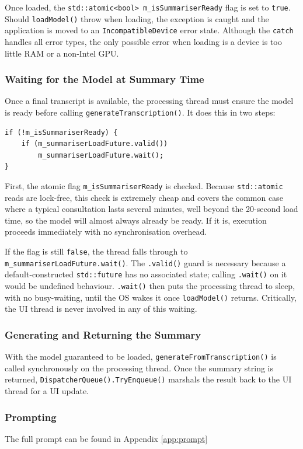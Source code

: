 Once loaded, the \texttt{std::atomic<bool> m\_isSummariserReady} flag is set to \texttt{true}. Should \texttt{loadModel()} throw when loading, the exception is caught and the application is moved to an \texttt{IncompatibleDevice} error state. Although the \texttt{catch} handles all error types, the only possible error when loading is a device is too little RAM or a non-Intel GPU.

\subsubsection{Waiting for the Model at Summary Time}
Once a final transcript is available, the processing thread must ensure the model is ready before calling \texttt{generateTranscription()}. It does this in two steps:

\begin{verbatim}
if (!m_isSummariserReady) {
    if (m_summariserLoadFuture.valid())
        m_summariserLoadFuture.wait();
}
\end{verbatim}

First, the atomic flag \texttt{m\_isSummariserReady} is checked. Because \texttt{std::atomic} reads are lock-free, this check is extremely cheap and covers the common case where a typical consultation lasts several minutes, well beyond the 20-second load time, so the model will almost always already be ready. If it is, execution proceeds immediately with no synchronisation overhead.

If the flag is still \texttt{false}, the thread falls through to \texttt{m\_summariserLoadFuture.wait()}. The \texttt{.valid()} guard is necessary because a default-constructed \texttt{std::future} has no associated state; calling \texttt{.wait()} on it would be undefined behaviour. \texttt{.wait()} then puts the processing thread to sleep, with no busy-waiting, until the OS wakes it once \texttt{loadModel()} returns. Critically, the UI thread is never involved in any of this waiting.

\subsubsection{Generating and Returning the Summary}
With the model guaranteed to be loaded, \texttt{generateFromTranscription()} is called synchronously on the processing thread. Once the summary string is returned, \texttt{DispatcherQueue().TryEnqueue()} marshals the result back to the UI thread for a UI update.

\subsubsection{Prompting}
The full prompt can be found in Appendix \ref{app:prompt}

